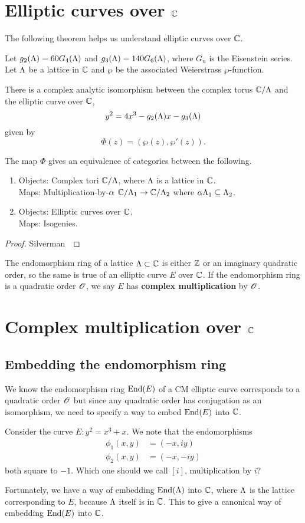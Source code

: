 \section{Elliptic curves over $\mathbb{C}$}
The following theorem helps us understand elliptic curves over $\mathbb{C}$.
\begin{thm}
Let $g_2(\Lambda)=60G_4(\Lambda)$ and $g_3(\Lambda)=140G_6(\Lambda)$, where $G_n$ is the Eisenstein series.
Let $\Lambda$ be a lattice in $\mathbb{C}$ and $\wp$ be the associated Weierstrass $\wp$-function.

There is a complex analytic isomorphism between the complex torus $\mathbb{C}/\Lambda$ and the elliptic curve over $\mathbb{C}$,
\[
y^2=4x^3-g_2(\Lambda)x-g_3(\Lambda)
\]
given by
\[
\Phi(z)=(\wp(z),\wp'(z)).
\]

The map $\Phi$ gives an equivalence of categories between the following.
\begin{enumerate}
\item
Objects: Complex tori $\mathbb{C}/\Lambda$, where $\Lambda$ is a lattice in $\mathbb{C}$.\\
Maps: Multiplication-by-$\alpha$ $\mathbb{C}/\Lambda_1\to \mathbb{C}/\Lambda_2$ where $\alpha\Lambda_1\subseteq \Lambda_2$.
\item
Objects: Elliptic curves over $\mathbb{C}$.\\
Maps: Isogenies.
\end{enumerate}
\end{thm}
\begin{proof}
Silverman~\cite[VI.5.1.1, 5.3]{Si86}
\end{proof}
The endomorphism ring of a lattice $\Lambda\subset \mathbb{C}$ is either $\mathbb{Z}$ or an imaginary quadratic order, so the same is true of an elliptic curve $E$ over $\mathbb{C}$. If the endomorphism ring is a quadratic order $\mathscr{O}$, we say $E$ has \textbf{complex multiplication} by $\mathscr{O}$.
\section{Complex multiplication over $\mathbb{C}$}
\subsection{Embedding the endomorphism ring}
We know the endomorphism ring $\operatorname{End}(E)$ of a CM elliptic curve corresponds to a quadratic order $\mathscr{O}$ but since any quadratic order has conjugation as an isomorphism, we need to specify a way to embed $\operatorname{End}(E)$ into $\mathbb{C}$. 
\begin{ex}
Consider the curve $E:y^2=x^3+x$. We note that the endomorphisms
\begin{align*}
\phi_1(x,y)&=(-x,iy)\\
\phi_2(x,y)&=(-x,-iy)
\end{align*}
both square to $-1$. Which one should we call $[i]$, multiplication by $i$?
\end{ex}
Fortunately, we have a way of embedding $\operatorname{End}(\Lambda)$ into $\mathbb{C}$, where $\Lambda$ is the lattice corresponding to $E$, because $\Lambda$ itself is in $\mathbb{C}$. This to give a canonical way of embedding $\operatorname{End}(E)$ into $\mathbb{C}$.

